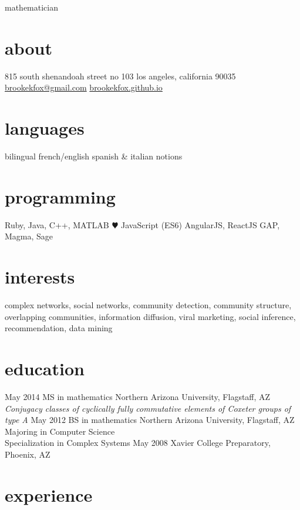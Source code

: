 \documentclass[]{friggeri-cv}
\begin{document}
       {mathematician}


\begin{aside}
  \section{about}
    815 south shenandoah street no 103
    los angeles, california 90035
    ~
    \href{mailto:brookekfox@gmail.com}{brookekfox@gmail.com}
    \href{http://brookekfox.github.io}{brookekfox.github.io}
  \section{languages}
    bilingual french/english
    spanish \& italian notions
  \section{programming}
    Ruby, Java, C++, MATLAB
    {\color{red} $\varheartsuit$} JavaScript (ES6)
    AngularJS, ReactJS
    GAP, Magma, Sage
\end{aside}

\section{interests}

complex networks, social networks, community detection, community structure,
overlapping communities, information diffusion, viral marketing, social
inference, recommendation, data mining

\section{education}

\begin{entrylist}
  \entry
    {May 2014}
    {MS {\normalfont in mathematics}}
    {Northern Arizona University, Flagstaff, AZ}
    {\emph{Conjugacy classes of cyclically fully commutative elements of Coxeter groups of type A}}
  \entry
    {May 2012}
    {BS {\normalfont in mathematics}}
    {Northern Arizona University, Flagstaff, AZ}
    {Majoring in Computer Science\\
    Specialization in Complex Systems}
  \entry
    {May 2008}
    {}
    {Xavier College Preparatory, Phoenix, AZ}
    {}
\end{entrylist}

\section{experience}
\end{document}
